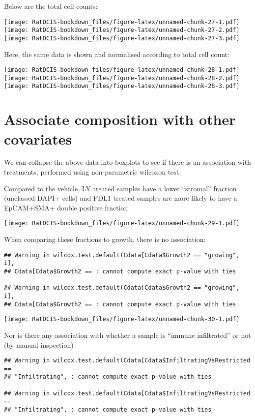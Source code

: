 \documentclass[
]{book}
\begin{document}
Below are the total cell counts:

\texttt{[image: RatDCIS-bookdown\_files/figure-latex/unnamed-chunk-27-1.pdf]} \texttt{[image: RatDCIS-bookdown\_files/figure-latex/unnamed-chunk-27-2.pdf]} \texttt{[image: RatDCIS-bookdown\_files/figure-latex/unnamed-chunk-27-3.pdf]}

Here, the same data is shown and normalised according to total cell count:

\texttt{[image: RatDCIS-bookdown\_files/figure-latex/unnamed-chunk-28-1.pdf]} \texttt{[image: RatDCIS-bookdown\_files/figure-latex/unnamed-chunk-28-2.pdf]} \texttt{[image: RatDCIS-bookdown\_files/figure-latex/unnamed-chunk-28-3.pdf]}

\hypertarget{associate-composition-with-other-covariates}{%
\section{Associate composition with other covariates}\label{associate-composition-with-other-covariates}}

We can collapse the above data into boxplots to see if there is an association with treatments, performed using non-parametric wilcoxon test.

Compared to the vehicle, LY treated samples have a lower ``stromal'' fraction (unclassed DAPI+ cells) and PDL1 treated samples are more likely to have a EpCAM+SMA+ double positive fraction

\texttt{[image: RatDCIS-bookdown\_files/figure-latex/unnamed-chunk-29-1.pdf]}

When comparing these fractions to growth, there is no association:

\begin{verbatim}
## Warning in wilcox.test.default(Cdata[Cdata$Growth2 == "growing", i],
## Cdata[Cdata$Growth2 == : cannot compute exact p-value with ties

## Warning in wilcox.test.default(Cdata[Cdata$Growth2 == "growing", i],
## Cdata[Cdata$Growth2 == : cannot compute exact p-value with ties
\end{verbatim}

\texttt{[image: RatDCIS-bookdown\_files/figure-latex/unnamed-chunk-30-1.pdf]}

Nor is there any association with whether a sample is ``immune infiltrated'' or not (by manual inspection)

\begin{verbatim}
## Warning in wilcox.test.default(Cdata[Cdata$InfiltratingVsRestricted ==
## "Infiltrating", : cannot compute exact p-value with ties

## Warning in wilcox.test.default(Cdata[Cdata$InfiltratingVsRestricted ==
## "Infiltrating", : cannot compute exact p-value with ties
\end{verbatim}
\end{document}
